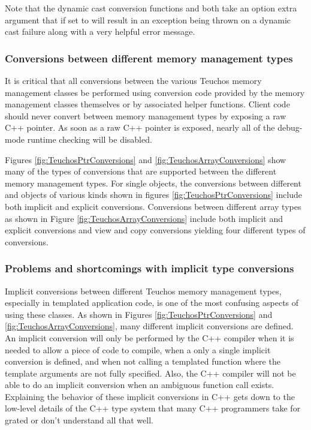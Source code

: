 \documentclass[pdf,ps2pdf,11pt]{SANDreport}
\begin{document}
Note that the dynamic cast conversion functions
{} and {}
both take an option extra argument {} that if
set to {} will result in an exception being thrown on a
dynamic cast failure along with a very helpful error message.


%
{}\subsubsection{Conversions between different memory management types}
\label{sec:teuchos-type-conversions}
%

It is critical that all conversions between the various Teuchos memory
management classes be performed using conversion code provided by the
memory management classes themselves or by associated helper
functions.  Client code should never convert between memory management
types by exposing a raw C++ pointer.  As soon as a raw C++ pointer is
exposed, nearly all of the debug-mode runtime checking will be
disabled.

Figures {}\ref{fig:TeuchosPtrConversions} and
{}\ref{fig:TeuchosArrayConversions} show many of the types of
conversions that are supported between the different memory management
types.  For single objects, the conversions between different
{} and {} objects of various kinds shown in
figures {}\ref{fig:TeuchosPtrConversions} include both implicit and
explicit conversions.  Conversions between different array types as
shown in Figure {}\ref{fig:TeuchosArrayConversions} include both
implicit and explicit conversions and view and copy conversions
yielding four different types of conversions.

%
{}\subsubsection{Problems and shortcomings with implicit type
conversions}
\label{sec:conversion-problems}
%

Implicit conversions between different Teuchos memory management
types, especially in templated application code, is one of the most
confusing aspects of using these classes.  As shown in Figures
{}\ref{fig:TeuchosPtrConversions} and
{}\ref{fig:TeuchosArrayConversions}, many different implicit
conversions are defined.  An implicit conversion will only be
performed by the C++ compiler when it is needed to allow a piece of
code to compile, when a only a single implicit conversion is defined,
and when not calling a templated function where the template arguments
are not fully specified.  Also, the C++ compiler will not be able to
do an implicit conversion when an ambiguous function call exists.
Explaining the behavior of these implicit conversions in C++ gets down
to the low-level details of the C++ type system that many C++
programmers take for grated or don't understand all that well.
\end{document}
